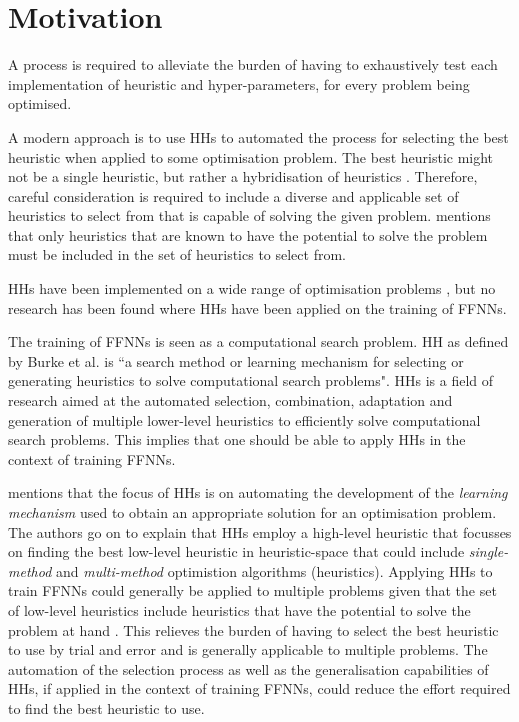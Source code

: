 \section{Motivation}
\label{sec:introduction:motivation}

A process is required to alleviate the burden of having to exhaustively test
each implementation of heuristic and hyper-parameters, for every problem being
optimised. 

A modern approach is to use \acp{HH} to automated the process for selecting the
best heuristic when applied to some optimisation problem. The best heuristic
might not be a single heuristic, but rather a hybridisation of heuristics
\cite{ref:pillay:2015}. Therefore, careful consideration is required to include
a diverse and applicable set of heuristics to select from that is capable of
solving the given problem. \citeauthor{ref:pillay:2015} \cite{ref:pillay:2015}
mentions that only heuristics that are known to have the potential to solve the
problem must be included in the set of heuristics to select from.

\acp{HH} have been implemented on a wide range of optimisation problems
\cite{ref:grobler:2011, ref:burke:2013, ref:pillay:2015}, but no research has
been found where \acp{HH} have been applied on the training of \acp{FFNN}.

The training of \acp{FFNN} is seen as a computational search problem. \Acl{HH}
as defined by Burke et al. \cite{ref:burke:2010} is ``a search method or
learning mechanism for selecting or generating heuristics to solve computational
search problems". \acp{HH} is a field of research aimed at the automated
selection, combination, adaptation and generation of multiple lower-level
heuristics to efficiently solve computational search problems. This implies that
one should be able to apply \acp{HH} in the context of training \acp{FFNN}.

\citeauthor{ref:grobler:2012} \cite{ref:grobler:2012} mentions that the focus of
\acp{HH} is on automating the development of the \textit{learning mechanism}
used to obtain an appropriate solution for an optimisation problem. The authors
go on to explain that \acp{HH} employ a high-level heuristic that focusses on
finding the best low-level heuristic in heuristic-space that could include
\textit{single-method} and \textit{multi-method} optimistion algorithms
(heuristics). Applying \acp{HH} to train \acp{FFNN} could generally be applied
to multiple problems given that the set of low-level heuristics include
heuristics that have the potential to solve the problem at hand
\cite{ref:burke:2010}. This relieves the burden of having to select the best
heuristic to use by trial and error and is generally applicable to multiple
problems. The automation of the selection process as well as the generalisation
capabilities of \acp{HH}, if applied in the context of training \acp{FFNN},
could reduce the effort required to find the best heuristic to use.

